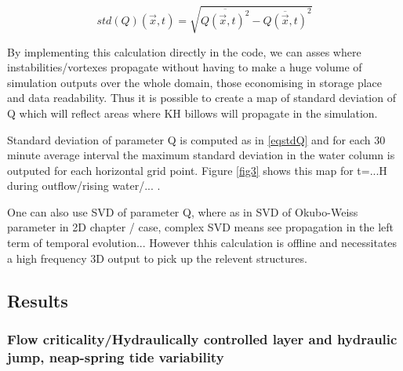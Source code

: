 \begin{equation} 
\label{eqstdQ} 
    std ( Q ) (\vec{x},t)=  \sqrt{   \overline{Q (\vec{x},t)^{2}} -  \overline{Q(\vec{x},t)}^{2}  }
\end{equation}

By implementing this calculation directly in the code, we can asses where instabilities/vortexes propagate without having to make a huge volume of simulation outputs over the whole domain, those economising in storage place and data readability. Thus it is possible to create a map of standard deviation of Q which will reflect areas where KH billows will propagate in the simulation.





Standard deviation of parameter Q is computed as in \ref{eqstdQ} and for each 30 minute average interval the maximum standard deviation in the water column is outputed for each horizontal grid point. Figure \ref{fig3} shows this map for t=...H during outflow/rising water/... .

One can also use SVD of parameter Q, where as in SVD of Okubo-Weiss parameter in 2D chapter / case, complex SVD means see propagation in the left  term of temporal evolution... However thhis calculation is offline and necessitates a high frequency 3D output to pick up the relevent structures.



\subsection{Results}


\subsubsection{Flow criticality/Hydraulically controlled layer and hydraulic jump, neap-spring tide variability}

